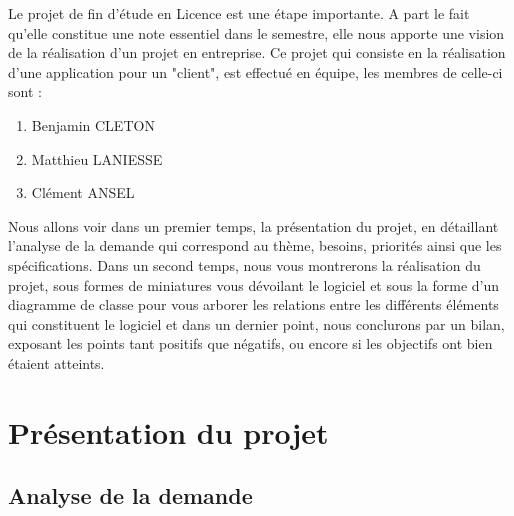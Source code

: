 \documentclass[a4paper,oneside]{article}
\begin{document}
Le projet de fin d'étude en Licence est une étape importante.
A part le fait qu'elle constitue une note essentiel dans le semestre,
elle nous apporte une vision de la réalisation d'un projet en entreprise.
Ce projet qui consiste en la réalisation d'une application pour un "client", 
est effectué en équipe, les membres de celle-ci sont :
\begin{enumerate}
	\item Benjamin CLETON
	\item Matthieu LANIESSE
	\item Clément ANSEL
\end{enumerate}
Nous allons voir dans un premier temps, la présentation du projet, en détaillant l'analyse de la demande qui correspond au thème, besoins, priorités ainsi que les spécifications.
Dans un second temps, nous vous montrerons la réalisation du projet, sous formes
de miniatures vous dévoilant le logiciel et sous la forme d'un diagramme de classe pour vous arborer les relations entre les différents éléments qui constituent le logiciel et dans un dernier point, nous conclurons par un bilan, exposant les points tant positifs que négatifs, ou encore si les objectifs ont bien étaient atteints.

\section{Présentation du projet}

\subsection{Analyse de la demande}
\end{document}
